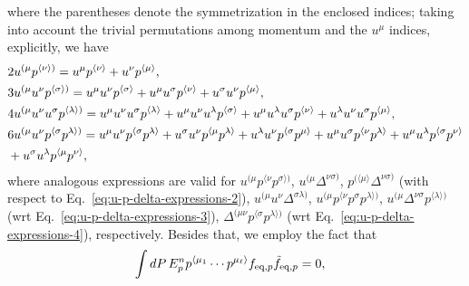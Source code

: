 \documentclass[aps,prd,preprint,nofootinbib,amsmath,amssymb,showpacs,longbibliography,singlecolumn,superscriptaddress,10pt]{revtex4-1}
\theoremstyle{plain}
\theoremstyle{definition}
\begin{document}
%
where the parentheses denote the symmetrization in the enclosed indices; taking into account the trivial permutations among momentum and the $u^{\mu}$ indices, explicitly, we have
%
\begin{subequations}
\label{eq:u-p-delta-expressions}
\begin{align}
&    
\label{eq:u-p-delta-expressions-1}
2 u^{(\mu} p^{\langle \nu \rangle)} = u^{\mu} p^{\langle \nu \rangle}
+ 
u^{\nu} p^{\langle \mu \rangle},
\\
&
\label{eq:u-p-delta-expressions-2}
3 u^{(\mu} u^{\nu} p^{\langle \sigma \rangle)} = 
u^{\mu} u^{\nu} p^{\langle \sigma \rangle}
+
u^{\mu} u^{\sigma} p^{\langle \nu \rangle}
+
u^{\sigma} u^{\nu} p^{\langle \mu \rangle},
\\
&
\label{eq:u-p-delta-expressions-3}
4  u^{(\mu} u^{\nu} u^{\sigma} p^{\langle \lambda \rangle)}
=
u^{\mu} u^{\nu} u^{\sigma} p^{\langle \lambda \rangle}
+
u^{\mu} u^{\nu} u^{\lambda} p^{\langle \sigma \rangle}
+
u^{\mu} u^{\lambda} u^{\sigma} p^{\langle \nu \rangle}
+
u^{\lambda} u^{\nu} u^{\sigma} p^{\langle \mu \rangle},
\\
&
\label{eq:u-p-delta-expressions-4}
6 u^{(\mu} u^{\nu} p^{\langle \sigma} p^{\lambda \rangle)}
=
u^{\mu} u^{\nu} p^{\langle \sigma} p^{\lambda \rangle}
+
u^{\sigma} u^{\nu} p^{\langle \mu} p^{\lambda \rangle}
+
u^{\lambda} u^{\nu} p^{\langle \sigma} p^{\mu \rangle}
+
u^{\mu} u^{\sigma} p^{\langle \nu} p^{\lambda \rangle}
+
u^{\mu} u^{\lambda} p^{\langle \sigma} p^{\nu \rangle}
\notag
\\
&
+
u^{\sigma} u^{\lambda} p^{\langle \mu} p^{\nu \rangle}
,
\end{align}    
\end{subequations}
%
where analogous expressions are valid for $u^{(\mu} p^{\langle \nu} p^{\sigma \rangle)}$, $u^{(\mu} \Delta^{\nu \sigma )}$, $p^{( \langle \mu \rangle} \Delta^{\nu \sigma )}$ (with respect to Eq.~\eqref{eq:u-p-delta-expressions-2}), $u^{(\mu} u^{\nu} \Delta^{\sigma \lambda)}$, $u^{(\mu} p^{\langle \nu} p^\sigma p^{\lambda \rangle )}$, $u^{(\mu} \Delta^{\nu \sigma} p^{\langle \lambda \rangle )}$ (wrt Eq.~\eqref{eq:u-p-delta-expressions-3}), $\Delta^{(\mu \nu} p^{\langle \sigma } p^{ \lambda \rangle)}$ (wrt Eq.~\eqref{eq:u-p-delta-expressions-4}), respectively. Besides that, we employ the fact that 
%
\begin{equation}
\begin{aligned}
&
\int dP\,
E_p^{n} p^{\langle \mu_{1}} \cdots p^{\mu_{\ell} \rangle}
f_{\text{eq},p} \Tilde{f}_{\text{eq},p} = 0,  \end{aligned}   
\end{equation}
\end{document}
